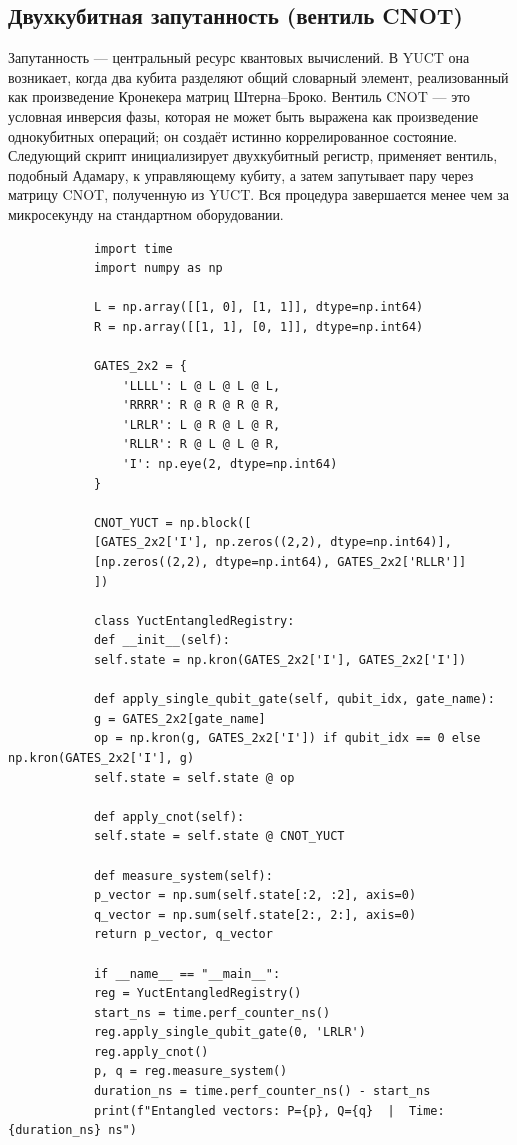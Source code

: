 \documentclass[12pt,a4paper]{article}
\begin{document}
	\subsection{Двухкубитная запутанность (вентиль CNOT)}
	
	Запутанность — центральный ресурс квантовых вычислений. В YUCT она возникает, когда два кубита разделяют общий словарный элемент, реализованный как произведение Кронекера матриц Штерна–Броко. Вентиль CNOT — это условная инверсия фазы, которая не может быть выражена как произведение однокубитных операций; он создаёт истинно коррелированное состояние. Следующий скрипт инициализирует двухкубитный регистр, применяет вентиль, подобный Адамару, к управляющему кубиту, а затем запутывает пару через матрицу CNOT, полученную из YUCT. Вся процедура завершается менее чем за микросекунду на стандартном оборудовании.
	
	\begin{tcolorbox}[title=Эмулятор запутанности CNOT YUCT (Python), breakable]
		\begin{lstlisting}
			import time
			import numpy as np
			
			L = np.array([[1, 0], [1, 1]], dtype=np.int64)
			R = np.array([[1, 1], [0, 1]], dtype=np.int64)
			
			GATES_2x2 = {
				'LLLL': L @ L @ L @ L,
				'RRRR': R @ R @ R @ R,
				'LRLR': L @ R @ L @ R,
				'RLLR': R @ L @ L @ R,
				'I': np.eye(2, dtype=np.int64)
			}
			
			CNOT_YUCT = np.block([
			[GATES_2x2['I'], np.zeros((2,2), dtype=np.int64)],
			[np.zeros((2,2), dtype=np.int64), GATES_2x2['RLLR']]
			])
			
			class YuctEntangledRegistry:
			def __init__(self):
			self.state = np.kron(GATES_2x2['I'], GATES_2x2['I'])
			
			def apply_single_qubit_gate(self, qubit_idx, gate_name):
			g = GATES_2x2[gate_name]
			op = np.kron(g, GATES_2x2['I']) if qubit_idx == 0 else np.kron(GATES_2x2['I'], g)
			self.state = self.state @ op
			
			def apply_cnot(self):
			self.state = self.state @ CNOT_YUCT
			
			def measure_system(self):
			p_vector = np.sum(self.state[:2, :2], axis=0)
			q_vector = np.sum(self.state[2:, 2:], axis=0)
			return p_vector, q_vector
			
			if __name__ == "__main__":
			reg = YuctEntangledRegistry()
			start_ns = time.perf_counter_ns()
			reg.apply_single_qubit_gate(0, 'LRLR')
			reg.apply_cnot()
			p, q = reg.measure_system()
			duration_ns = time.perf_counter_ns() - start_ns
			print(f"Entangled vectors: P={p}, Q={q}  |  Time: {duration_ns} ns")
		\end{lstlisting}
	\end{tcolorbox}
	
\end{document}
